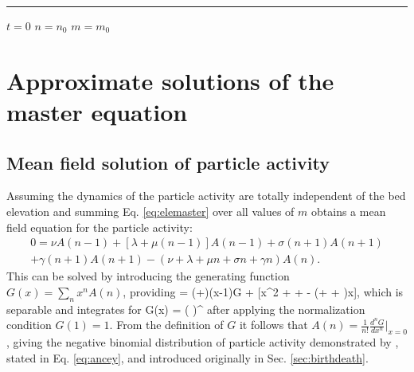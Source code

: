 \rule{\linewidth}{1pt}

\begin{algorithmic}
	\State $t = 0$ 
	\State $n = n_0$
	\State $m =  m_0$
	
	\EndWhile
\end{algorithmic}

\section{Approximate solutions of the master equation}

\subsection{Mean field solution of particle activity}

Assuming the dynamics of the particle activity are totally independent of the bed elevation and summing Eq. \ref{eq:elemaster} over all values of $m$ obtains a mean field equation for the particle activity: 
\begin{multline} 0 = \nu A(n-1) + [\lambda + \mu(n-1)]A(n-1) + \sigma(n+1)A(n+1) \\
	+\gamma(n+1)A(n+1)-(\nu  + \lambda + \mu n + \sigma n + \gamma n)A(n).\end{multline}
This can be solved by introducing the generating function \citep{Cox1965} $G(x) = \sum_n x^n A(n)$, providing
 = (\nu+\lambda)(x-1)G + [\mu x^2 + \sigma + \gamma - (\mu + \sigma + \gamma)x],\ee
which is separable and integrates for 
\be G(x) = \Bigg( \Bigg)^{\frac{\nu + \lambda}{\mu}}\ee
after applying the normalization condition $G(1)=1$.
From the definition of $G$ it follows that $A(n) = \frac{1}{n!} \frac{d^nG}{dx^n}|_{x=0}$, giving the negative binomial distribution of particle activity demonstrated by \citet{Ancey2008}, stated in Eq. \ref{eq:ancey}, and introduced originally in Sec. \ref{sec:birthdeath}.

